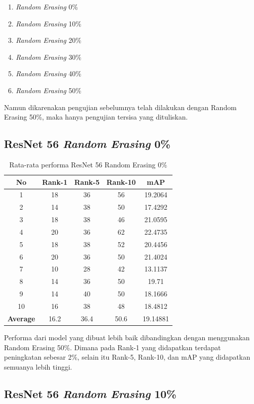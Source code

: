 \begin{enumerate}[nolistsep]
	\item \textit{Random Erasing} 0\%
	\item \textit{Random Erasing} 10\%
	\item \textit{Random Erasing} 20\%
	\item \textit{Random Erasing} 30\%
	\item \textit{Random Erasing} 40\%
	\item \textit{Random Erasing} 50\%
	\vspace{1ex}
\end{enumerate}
Namun dikarenakan pengujian sebelumnya telah dilakukan dengan Random Erasing 50\%, maka hanya pengujian tersisa yang dituliskan.

\subsection{ResNet 56 \textit{Random Erasing} 0\%}
\begin{longtable}{|c|c|c|c|c|}
	\caption{Rata-rata performa ResNet 56 Random Erasing 0\%}
	\label{tabel: 30}\\
	\hline
	\rowcolor[HTML]{C0C0C0}
	\textbf{No} &\textbf{Rank-1} & \textbf{Rank-5} & \textbf{Rank-10} & \textbf{mAP} \\
	\hline
	1 &18 &36 &56 &19.2064 \\
	2 &14 &38 &50 &17.4292 \\
	3 &18 &38 &46 &21.0595 \\
	4 &20 &36 &62 &22.4735 \\
	5 &18 &38 &52 &20.4456 \\
	6 &20 &36 &50 &21.4024 \\
	7 &10 &28 &42 &13.1137 \\
	8 &14 &36 &50 &19.71 \\
	9 &14 &40 &50 &18.1666 \\
	10 &16 &38 &48 &18.4812 \\
	\hline
	\textbf{Average} & 16.2 & 36.4 & 50.6 &19.14881 \\
	\hline
\end{longtable}

Performa dari model yang dibuat lebih baik dibandingkan dengan menggunakan Random Erasing 50\%. Dimana pada Rank-1 yang didapatkan terdapat peningkatan sebesar 2\%, selain itu Rank-5, Rank-10, dan mAP yang didapatkan semuanya lebih tinggi.

\subsection{ResNet 56 \textit{Random Erasing} 10\%}

